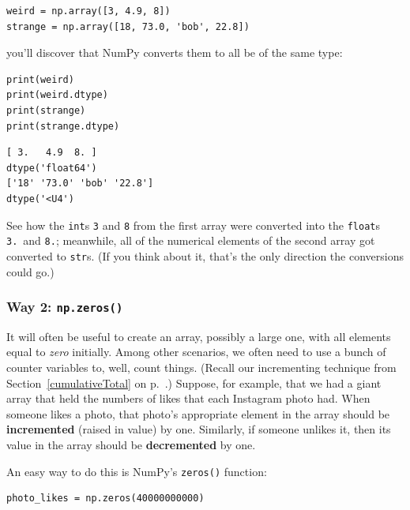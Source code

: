 \begin{Verbatim}[fontsize=\small,samepage=true,frame=single,framesep=3mm]
weird = np.array([3, 4.9, 8])
strange = np.array([18, 73.0, 'bob', 22.8])
\end{Verbatim}

you'll discover that NumPy converts them to all be of the same type:

\begin{Verbatim}[fontsize=\small,samepage=true,frame=single,framesep=3mm]
print(weird)
print(weird.dtype)
print(strange)
print(strange.dtype)
\end{Verbatim}

\begin{Verbatim}[fontsize=\small,samepage=true,frame=leftline,framesep=5mm,framerule=1mm]
[ 3.   4.9  8. ]
dtype('float64')
['18' '73.0' 'bob' '22.8']
dtype('<U4')
\end{Verbatim}

See how the \texttt{int}s \texttt{3} and \texttt{8} from the first array were
converted into the \texttt{float}s \texttt{3.}~and \texttt{8.}; meanwhile, all
of the numerical elements of the second array got converted to \texttt{str}s.
(If you think about it, that's the only direction the conversions could go.)

\subsubsection{Way 2: \texttt{np.zeros()}}


It will often be useful to create an array, possibly a large one, with all
elements equal to \textit{zero} initially. Among other scenarios, we often need
to use a bunch of counter variables to, well, count things. (Recall our
incrementing technique from Section~\ref{cumulativeTotal} on
p.~\pageref{cumulativeTotal}.) Suppose, for example, that we had a giant array
that held the numbers of likes that each Instagram photo had. When someone
likes a photo, that photo's appropriate element in the array should be
\textbf{incremented} (raised in value) by one. Similarly, if someone unlikes
it, then its value in the array should be \textbf{decremented} by one.

An easy way to do this is NumPy's \texttt{zeros()} function:

\begin{Verbatim}[fontsize=\small,samepage=true,frame=single,framesep=3mm]
photo_likes = np.zeros(40000000000)
\end{Verbatim}

